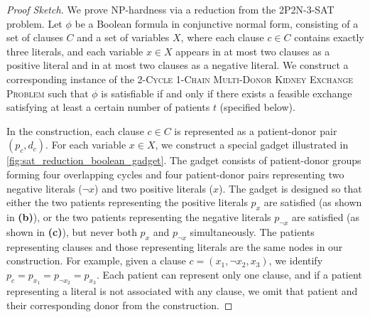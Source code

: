 \begin{proof}[Proof Sketch]
We prove NP-hardness via a reduction from the \textsc{2P2N-3-SAT} problem. Let $\phi$ be a Boolean formula in conjunctive normal form, consisting of a set of clauses $C$ and a set of variables $X$, where each clause $c \in C$ contains exactly three literals, and each variable $x \in X$ appears in at most two clauses as a positive literal and in at most two clauses as a negative literal. We construct a corresponding instance of the \textsc{2-Cycle 1-Chain Multi-Donor Kidney Exchange Problem} such that $\phi$ is satisfiable if and only if there exists a feasible exchange satisfying at least a certain number of patients $t$ (specified below).

In the construction, each clause $c \in C$ is represented as a patient-donor pair $(p_c, d_c)$. For each variable $x \in X$, we construct a special gadget illustrated in \autoref{fig:sat_reduction_boolean_gadget}. The gadget consists of patient-donor groups forming four overlapping cycles and four patient-donor pairs representing two negative literals ($\neg{x}$) and two positive literals ($x$). The gadget is designed so that either the two patients representing the positive literals $p_x$ are satisfied (as shown in \textbf{(b)}), or the two patients representing the negative literals $p_{\neg{x}}$ are satisfied (as shown in \textbf{(c)}), but never both $p_x$ and $p_{\neg{x}}$ simultaneously. The patients representing clauses and those representing literals are the same nodes in our construction. For example, given a clause $c = (x_1, \neg{x_2}, x_3)$, we identify $p_c = p_{x_1} = p_{\neg{x_2}} = p_{x_3}$. Each patient can represent only one clause, and if a patient representing a literal is not associated with any clause, we omit that patient and their corresponding donor from the construction.


\end{proof}
